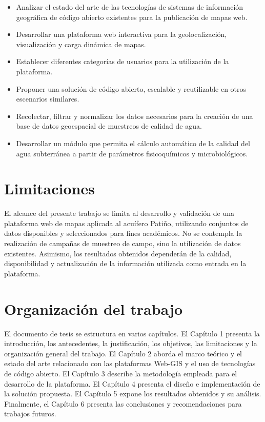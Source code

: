\documentclass[12pt,a4paper]{report}
\begin{document}
\begin{itemize}
	\item Analizar el estado del arte de las tecnologías de sistemas de información geográfica de código abierto existentes para la publicación de mapas web.
	\item Desarrollar una plataforma web interactiva para la geolocalización, visualización y carga dinámica de mapas.
	\item Establecer diferentes categorías de usuarios para la utilización de la plataforma.
	\item Proponer una solución de código abierto, escalable y reutilizable en otros escenarios similares.
	\item Recolectar, filtrar y normalizar los datos necesarios para la creación de una base de datos geoespacial de muestreos de calidad de agua.
	\item Desarrollar un módulo que permita el cálculo automático de la calidad del agua subterránea a partir de parámetros fisicoquímicos y microbiológicos.
\end{itemize}

\section{Limitaciones}

El alcance del presente trabajo se limita al desarrollo y validación de una plataforma web de mapas aplicada al acuífero Patiño, utilizando conjuntos de datos disponibles y seleccionados para fines académicos. No se contempla la realización de campañas de muestreo de campo, sino la utilización de datos existentes. Asimismo, los resultados obtenidos dependerán de la calidad, disponibilidad y actualización de la información utilizada como entrada en la plataforma.

\section{Organización del trabajo}

El documento de tesis se estructura en varios capítulos. El Capítulo 1 presenta la introducción, los antecedentes, la justificación, los objetivos, las limitaciones y la organización general del trabajo. El Capítulo 2 aborda el marco teórico y el estado del arte relacionado con las plataformas Web-GIS y el uso de tecnologías de código abierto. El Capítulo 3 describe la metodología empleada para el desarrollo de la plataforma. El Capítulo 4 presenta el diseño e implementación de la solución propuesta. El Capítulo 5 expone los resultados obtenidos y su análisis. Finalmente, el Capítulo 6 presenta las conclusiones y recomendaciones para trabajos futuros.
\end{document}
